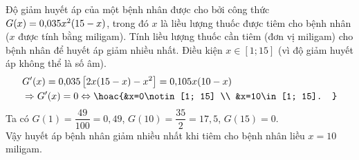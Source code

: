 \begin{bt}%
	Độ giảm huyết áp của một bệnh nhân được cho bởi công thức $\break G(x)=0{,}035 x^2(15-x)$, trong đó $x$ là liều lượng thuốc được tiêm cho bệnh nhân ($x$ được tính bằng miligam). Tính liều lượng thuốc cần tiêm (đơn vị miligam) cho bệnh nhân để huyết áp giảm nhiều nhất.
	\loigiai
	{Điều kiện $x \in[1 ; 15]$ (vì độ giảm huyết áp không thể là số âm).
		$$\begin{aligned}
			& G'(x)=0{,}035\left[2 x(15-x)-x^2\right]=0{,}105 x(10-x) \\
			& \Rightarrow G'(x)=0 \Leftrightarrow\hoac{&x=0\notin[1; 15] \\
				&x=10\in[1; 15].
		}\end{aligned}$$
		Ta có $G(1)=\dfrac{49}{100}=0{,}49$, $G(10)=\dfrac{35}{2}=17{,}5$, $G(15)=0$.\\
		Vậy huyết áp bệnh nhân giảm nhiều nhất khi tiêm cho bệnh nhân liều $x=10$ miligam.
	}
\end{bt}

